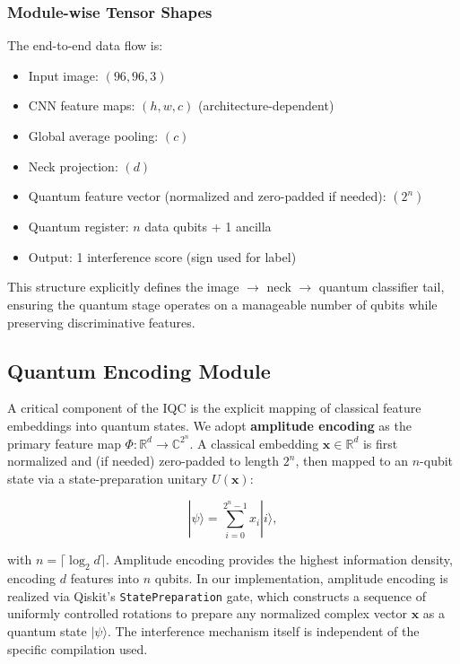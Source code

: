 \documentclass[conference]{IEEEtran}
\begin{document}
\subsubsection{Module-wise Tensor Shapes}
The end-to-end data flow is:
\begin{itemize}
    \item Input image: $(96, 96, 3)$
    \item CNN feature maps: $(h, w, c)$ (architecture-dependent)
    \item Global average pooling: $(c)$
    \item Neck projection: $(d)$
    \item Quantum feature vector (normalized and zero-padded if needed): $(2^n)$
    \item Quantum register: $n$ data qubits + 1 ancilla
    \item Output: 1 interference score (sign used for label)
\end{itemize}

This structure explicitly defines the image $\rightarrow$ neck $\rightarrow$ quantum classifier tail, ensuring the quantum stage operates on a manageable number of qubits while preserving discriminative features.

\subsection{Quantum Encoding Module}
A critical component of the IQC is the explicit mapping of classical feature embeddings into quantum states. We adopt \textbf{amplitude encoding} as the primary feature map $\Phi: \mathbb{R}^d \rightarrow \mathbb{C}^{2^n}$. A classical embedding $\mathbf{x} \in \mathbb{R}^d$ is first normalized and (if needed) zero-padded to length $2^n$, then mapped to an $n$-qubit state via a state-preparation unitary $U(\mathbf{x})$:

\begin{equation}
|\psi\rangle = \sum_{i=0}^{2^n - 1} x_i |i\rangle,
\end{equation}

with $n = \lceil \log_2 d \rceil$. Amplitude encoding provides the highest information density, encoding $d$ features into $n$ qubits. In our implementation, amplitude encoding is realized via Qiskit's \texttt{StatePreparation} gate, which constructs a sequence of uniformly controlled rotations to prepare any normalized complex vector $\mathbf{x}$ as a quantum state $|\psi\rangle$. The interference mechanism itself is independent of the specific compilation used.
\end{document}
